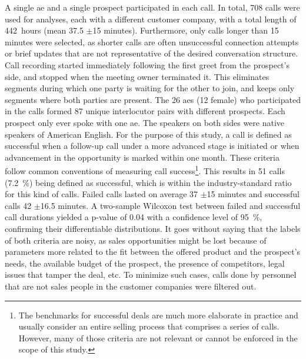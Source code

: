 A single \ac{ae} and a single prospect participated in each call.
In total, 708 calls were used for analyses, each with a different customer company, with a total length of \SI{442}{hours} (mean 37.5 $\pm$15 minutes).
Furthermore, only calls longer than 15 minutes were selected, as shorter calls are often unsuccessful connection attempts or brief updates that are not representative of the desired conversation structure.
Call recording started immediately following the first greet from the prospect's side, and stopped when the meeting owner terminated it.
This eliminates segments during which one party is waiting for the other to join, and keeps only segments where both parties are present.
The 26 \acp{ae} (12 female) who participated in the calls formed 87 unique interlocutor pairs with different prospects.
Each prospect only ever spoke with one \ac{ae}.
The speakers on both sides were native speakers of American English.
For the purpose of this study, a call is defined as successful when a follow-up call under a more advanced stage is initiated or when advancement in the opportunity is marked within one month.
These criteria follow common conventions of measuring call success\footnote{The benchmarks for successful deals are much more elaborate in practice and usually consider an entire selling process that comprises a series of calls.
However, many of those criteria are not relevant or cannot be enforced in the scope of this study.}.
This results in 51 calls (\SI{7.2}{\percent}) being defined as successful, which is within the industry-standard ratio for this kind of calls.
Failed calls lasted on average 37 $\pm$15 minutes and successful calls 42 $\pm$16.5 minutes.
A two-sample Wilcoxon test \citep{Wilcoxon1945individual} between failed and successful call durations yielded a p-value of 0.04 with a confidence level of \SI{95}{\percent}, confirming their differentiable distributions.
It goes without saying that the labels of both criteria are noisy, as sales opportunities might be lost because of parameters more related to the fit between the offered product and the prospect's needs, the available budget of the prospect, the presence of competitors, legal issues that tamper the deal, etc.
To minimize such cases, calls done by personnel that are not sales people in the customer companies were filtered out.

